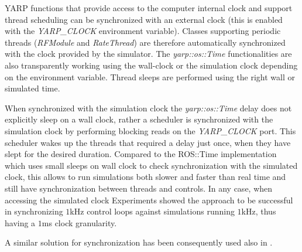YARP functions that provide access to the computer internal clock and support thread scheduling can be synchronized with an external clock (this is enabled with the \emph{YARP\_CLOCK} environment variable). Classes supporting periodic threads (\emph{RFModule} and \emph{RateThread}) are therefore automatically synchronized with the clock provided by the simulator. The \emph{yarp::os::Time} functionalities are also transparently working using the wall-clock or the simulation clock depending on the environment variable. Thread sleeps are performed using the right wall or simulated time.


When synchronized with the simulation clock the \emph{yarp::os::Time} delay does not explicitly sleep on a wall clock, rather a scheduler is synchronized with the simulation clock by performing blocking reads on the \emph{YARP\_CLOCK} port. This scheduler wakes up the threads that required a delay just once, when they have slept for the desired duration. Compared to the ROS::Time implementation which uses small sleeps on wall clock to check synchronization with the simulated clock, this allows to run simulations both slower and faster than real time and still have synchronization between threads and controls. In any case, when accessing the simulated clock Experiments showed the approach to be successful in synchronizing $1$kHz control loops against simulations running $1$kHz, thus having a $1$ms clock granularity.

A similar solution for synchronization has been consequently used also in \cite{wbi14}.

